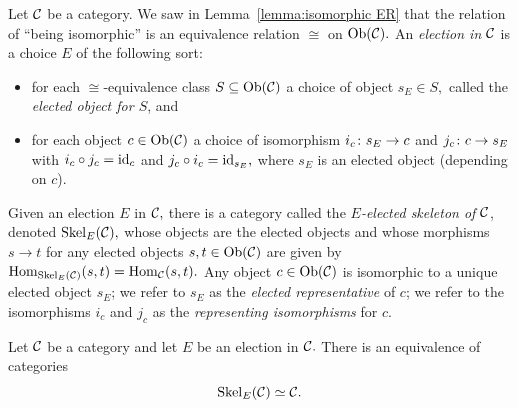 \documentclass[../main/CT4S-EN-RU]{subfiles}
\begin{document}
\begin{definitionENG}[Skeleton]
Let $\mathcal{C}$ be a category. We saw in Lemma~\ref{lemma:isomorphic ER} that the relation of “being isomorphic” is an equivalence relation $\cong$ on $\operatorname{Ob}(\mathcal{C}).$ An {\em election in $\mathcal{C}$} is a choice $E$ of the following sort:
\begin{itemize}
\item for each $\cong$-equivalence class $S\subseteq\operatorname{Ob}(\mathcal{C})$ a choice of object $s_E\in S,$ called the {\em elected object for $S$}, and
\item for each object $c\in\operatorname{Ob}(\mathcal{C})$ a choice of isomorphism $i_c\colon s_E\rightarrow c$ and $j_c\colon c\rightarrow s_E$ with $i_c\circ j_c=\operatorname{id}_c$ and $j_c\circ i_c=\operatorname{id}_{s_E},$ where $s_E$ is an elected object (depending on $c$).
\end{itemize}
Given an election $E$ in $\mathcal{C},$ there is a category called the {\em $E$-elected skeleton of $\mathcal{C}$}, denoted $\operatorname{Skel}_E(\mathcal{C}),$ whose objects are the elected objects and whose morphisms $s\to t$ for any elected objects $s,t\in\operatorname{Ob}(\mathcal{C})$ are given by $\operatorname{Hom}_{\operatorname{Skel}_E(\mathcal{C})}(s,t)=\operatorname{Hom}_\mathcal{C}(s,t).$ Any object $c\in\operatorname{Ob}(\mathcal{C})$ is isomorphic to a unique elected object $s_E$; we refer to $s_E$ as the {\em elected representative} of $c$; we refer to the isomorphisms $i_c$ and $j_c$ as the {\em representing isomorphisms} for $c.$
\end{definitionENG}

\begin{definitionRUS}[Skeleton]
\end{definitionRUS}

\begin{propositionENG}
Let $\mathcal{C}$ be a category and let $E$ be an election in $\mathcal{C}.$ There is an equivalence of categories $$\operatorname{Skel}_E(\mathcal{C})\simeq\mathcal{C}.$$
\end{propositionENG}

\begin{propositionRUS}
\end{propositionRUS}
\end{document}
